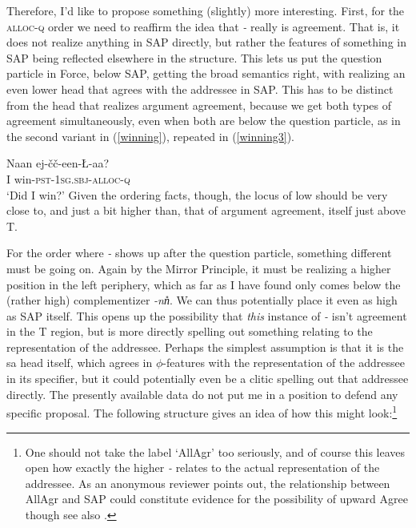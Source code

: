 \documentclass[output=paper, modfonts, nonflat]{langsci/langscibook}
\begin{document}
Therefore, I'd like to propose something (slightly) more
interesting. First, for the \textsc{alloc}{}-\textsc{q} order we need to
reaffirm the idea that \textit{-\nga} really is agreement. That is, it
does not realize anything in SAP directly, but rather the features of
something in SAP being reflected elsewhere in the structure. This lets
us put the question particle in Force, below SAP, getting the broad
semantics right, with \allagr{} realizing an even lower head that
agrees with the addressee in SAP. This has to be distinct from the
head that realizes argument agreement, because we get both types of
agreement simultaneously, even when both are below the question
particle, as in the second variant in (\ref{winning}), repeated in
(\ref{winning3}).

\ea\label{winning3}\gll Naan \J ej-\v{c}\v{c}-een-\nga\L-aa?\\
 I win-\textsc{pst}-1\textsc{sg}.\textsc{sbj}-\textsc{alloc}-\textsc{q}\\
 \glt `Did I win?'
\z
%
Given the ordering facts, though, the locus of low \allagr{} should be
very close to, and just a bit higher than, that of argument agreement,
itself just above T.

\noindent For the order where \textit{-\nga} shows up after the question
particle, something different must be going on. Again by the Mirror
Principle, it must be realizing a higher position in the left
periphery, which as far as I have found only comes below the (rather
high) complementizer \textit{-nn\U}. We can thus potentially place it
even as high as SAP itself. This opens up the possibility that
\emph{this} instance of \textit{-\nga} isn't agreement in the T
region, but is more directly spelling out something relating to the
representation of the addressee. Perhaps the simplest assumption is
that it is the sa head itself, which agrees in $\phi$-features with
the representation of the addressee in its specifier, but it could
potentially even be a clitic spelling out that addressee directly. The
presently available data do not put me in a position to defend any
specific proposal. The following structure gives an idea of how this
might look:\footnote{One should not take the label `AllAgr' too
  seriously, and of course this leaves open how exactly the higher
  \textit{-\nga} relates to the actual representation of the
  addressee. As an anonymous reviewer points out, the relationship
  between AllAgr and SAP could constitute evidence for the possibility
  of upward Agree \citep[e.g.][]{zeijlstra:2012} though see also .}
\end{document}
